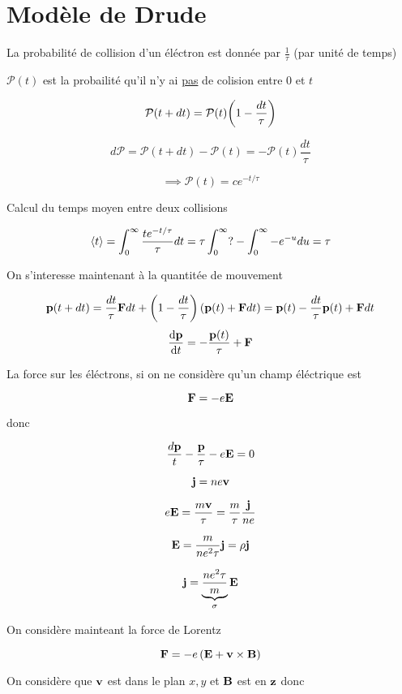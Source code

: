 



\section*{Modèle de Drude}

La probabilité de collision d'un éléctron est donnée par $\frac{1}{\tau}$ (par unité de temps) 

$\mathcal{P}(t)$ est la probailité qu'il n'y ai \underline{pas} de colision entre $0$ et $t$

$$\mathcal{P} (t+dt) = \mathcal{P} (t) \qty(1- \frac{dt}{\tau} )$$ 


$$d \mathcal{P} = \mathcal{P}(t+dt) - \mathcal{P} (t)= -\mathcal{P} (t) \frac{dt}{\tau} $$ 


$$\implies \mathcal{P} (t) = c e^{-t/\tau}$$ 


Calcul du temps moyen entre deux collisions

$$ \left\langle t \right\rangle = \int_{0}^\infty \frac{te^{-t/\tau}}{\tau} dt = \tau \int_{0}^\infty ? - \int_{0}^\infty - e^{-u} du = \tau $$ 

On s'interesse maintenant à la quantitée de mouvement 


$$	\vb{p}(t+dt) = \frac{dt}{\tau} \vb{F} dt + \left( 1-\frac{dt}{\tau}  \right) \left( \vb{p}(t) + \vb{F} dt \right) = \vb{p}(t) - \frac{dt}{\tau} \vb{p}(t) + \vb{F}dt
$$
$$\dv{\vb{p}}{t} = - \frac{\vb{p}(t)}{\tau} + \vb{F}$$ 



La force sur les éléctrons, si on ne considère qu'un champ éléctrique est 

$$\vb{F} = -e\vb{E}$$ 

donc 

$$\frac{d\vb{p}}{t} - \frac{\vb{p}}{\tau} - e\vb{E} = 0$$ 

$$\vb{j} = ne\vb{v}$$ 

$$e\vb{E}=  \frac{m\vb{v}}{\tau} = \frac{m}{\tau} \frac{\vb{j}}{ne} $$ 

$$\vb{E} = \frac{m}{ne^2\tau} \vb{j} = \rho \vb{j}$$ 

$$\vb{j} = \underbrace{\frac{ne^2\tau}{m}}_{\sigma} \vb{E}$$ 


On considère mainteant la force de Lorentz

$$\vb{F} = -e\left( \vb{E} + \vb{v} \times \vb{B} \right) $$ 

On considère que $\vb{v}$ est dans le plan $x,y$ et $\vb{B}$ est en $\vb{z}$ donc

